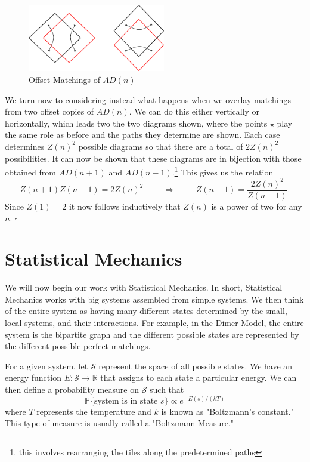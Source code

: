 \documentclass{article}
\begin{document}
\begin{figure}[htb!]
	\begin{center}
 	\includegraphics[width=6cm]{offset_match.png}
  	\caption{Offset Matchings of $AD(n)$}
	 \label{fig:offset_match}
 	 \end{center}
\end{figure} 


	We turn now to considering instead what happens when we overlay matchings from two offset copies of $AD(n)$. We can do this either vertically or horizontally, which leads two the two diagrams shown, where the points $\star$ play the same role as before and the paths they determine are shown. Each case determines $Z(n)^2$ possible diagrams so that there are a total of $2Z(n)^2$ possibilities. It can now be shown that these diagrams are in bijection with those obtained from $AD(n+1)$ and $AD(n-1)$.\footnote{this involves rearranging the tiles along the predetermined paths} This gives us the relation 
	$$
	Z(n+1)Z(n-1) = 2 Z(n)^2 \hspace{1cm} \Rightarrow \hspace{1cm} Z(n+1) = \frac{2 Z(n)^2}{Z(n-1)}. 
	$$
Since $Z(1)= 2$ it now follows inductively that $Z(n)$ is a power of two for any $n$. 	$\square$
	
	
	\section{Statistical Mechanics}
	
	\hspace{1cm} We will now begin our work with Statistical Mechanics. In short, Statistical Mechanics works with big systems assembled from simple systems. We then think of the entire system as having many different states determined by the small, local systems, and their interactions. For example, in the Dimer Model, the entire system is the bipartite graph and the different possible states are represented by the different possible perfect matchings. 
	
	For a given system, let $\mathscr{S}$ represent the space of all possible states. We have an energy function $E: \mathscr{S} \rightarrow \mathbb{R}$ that assigns to each state a particular energy. We can then define a probability measure on $\mathscr{S}$ such that  
	$$
	\mathbb{P} \{\text{system is in state } s\} \propto e^{-E(s)/(kT)}
	$$
where $T$ represents the temperature and $k$ is known as "Boltzmann's constant." This type of measure is usually called a "Boltzmann Measure." 
\end{document}

